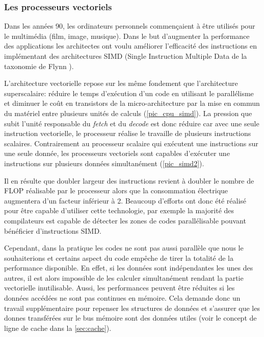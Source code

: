 \subsubsection{Les processeurs vectoriels } \label{sec:cpu_vectoriel}

Dans les années 90, les ordinateurs personnels commençaient à être utilisés pour le multimédia (film, image, musique). Dans le but d'augmenter la performance des applications les architectes ont voulu améliorer l'efficacité des instructions en implémentant des architectures SIMD (Single Instruction Multiple Data de la taxonomie de Flynn ). 


L'architecture vectorielle repose sur les même fondement que l'architecture superscalaire: réduire le temps d'exécution d'un code en utilisant le parallélisme et diminuer le coût en transistors de la micro-architecture par la mise en commun du matériel entre plusieurs unités de calculs (\autoref{pic_cpu_simd}). La pression que subit l'unité responsable du \textit{fetch} et du \textit{decode} est donc réduire car avec une seule instruction vectorielle, le processeur réalise le travaille de plusieurs instructions scalaires.  Contrairement au processeur scalaire qui exécutent une instructions sur une seule donnée, les processeurs vectoriels sont capables d'exécuter une instructions sur plusieurs données simultanément (\autoref{pic_simd2}).


Il en résulte que doubler largeur des instructions revient à doubler le nombre de FLOP réalisable par le processeur alors que la consommation électrique augmentera d'un facteur inférieur à 2. Beaucoup d'efforts ont donc été réalisé pour être capable d'utiliser cette technologie, par exemple la majorité des compilateurs est capable de détecter les zones de codes parallélisable pouvant bénéficier d'instructions SIMD.

Cependant, dans la pratique les codes ne sont pas aussi parallèle que nous le souhaiterions et certains aspect du code empêche de tirer la totalité de la performance disponible. En effet, si les données sont indépendantes les unes des autres, il est alors impossible de les calculer simultanément rendant la partie vectorielle inutilisable. Aussi, les performances peuvent être réduites si les données accédées ne sont pas continues en mémoire. Cela demande donc un travail supplémentaire pour repenser les structures de données et s'assurer que les donnes transférées sur le bus mémoire sont des données utiles (voir le concept de ligne de cache dans la \autoref{sec:cache}).

